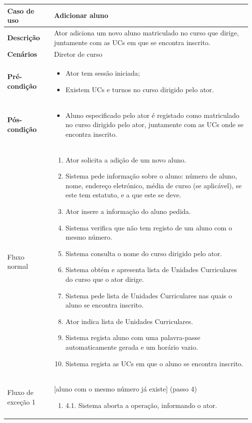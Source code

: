\documentclass[12pt, a4paper]{article}
\newenvironment{condition}{
    \begin{itemize}[wide=0pt]
        \vspace{-0.2cm}
}{
        \vspace{-0.5cm}
    \end{itemize}
}
\newcommand\flow[1]{
    Fluxo normal &
    \singlespacing
    \begin{enumerate}[wide=0pt]
        #1
        \vspace{-0.3cm}
    \end{enumerate} \\ \hline
}
\newcommand\otherflow[3]{
    #1 &
    #2
    \singlespacing
    \begin{enumerate}[wide=0pt]
        #3
        \vspace{-0.3cm}
    \end{enumerate} \\ \hline
}
\newenvironment{usecase}[5]{
    \begin{table}[H]
        \centering
        \begin{tabular}{|>{\centering\arraybackslash\bf}m{3cm}|m{13cm}|}
            \hline
            Caso de uso & \textbf{#1} \\

            \hline
            Descrição & #2 \\

            \hline
            Cenários & #3 \\

            \hline
            Pré-condição &
            \begin{condition}
                #4
            \end{condition} \\

            \hline
            Pós-condição &
            \begin{condition}
                #5
            \end{condition} \\

            \hline
}{
    \end{tabular}
\end{table}
}
\begin{document}
\begin{usecase}
    {Adicionar aluno}
    {Ator adiciona um novo aluno matriculado no curso que dirige, juntamente com as UCs em que se
        encontra inscrito.}
    {Diretor de curso}
    {
        \item Ator tem sessão iniciada;
        \item Existem UCs e turnos no curso dirigido pelo ator.
    }
    {
        \item Aluno especificado pelo ator é registado como matriculado no curso dirigido pelo ator,
        juntamente com as UCs onde se encontra inscrito.
    }

    \flow{
        \item Ator solicita a adição de um novo aluno.
        \item Sistema pede informação sobre o aluno: número de aluno, nome, endereço eletrónico,
            média de curso (se aplicável), se este tem estatuto, e a que este se deve.
        \item Ator insere a informação do aluno pedida.
        \item Sistema verifica que não tem registo de um aluno com o mesmo número.
        \item Sistema consulta o nome do curso dirigido pelo ator.
        \item Sistema obtém e apresenta lista de Unidades Curriculares do curso que o ator dirige.
        \item Sistema pede lista de Unidades Curriculares nas quais o aluno se encontra inscrito.
        \item Ator indica lista de Unidades Curriculares.
        \item Sistema regista aluno com uma palavra-passe automaticamente gerada e um horário
            vazio.
        \item Sistema regista as UCs em que o aluno se encontra inscrito.
    }

    \otherflow{Fluxo de exceção 1}
        {[aluno com o mesmo número já existe] (passo 4)}{

        \item[4.1.] Sistema aborta a operação, informando o ator.
    }
\end{usecase}
\end{document}
